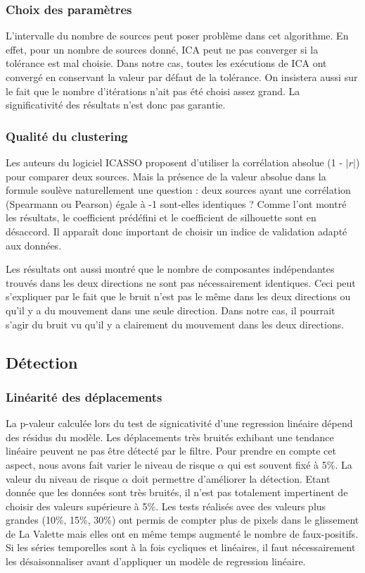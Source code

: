 \documentclass[11pt, openany]{report}
\begin{document}
\subsubsection{Choix des paramètres}
L'intervalle du nombre de sources peut poser problème dans cet algorithme. En effet, pour un nombre de sources donné, ICA peut ne pas converger si la tolérance est mal choisie. Dans notre cas, toutes les exécutions de ICA ont convergé en conservant la valeur par défaut de la tolérance. On insistera aussi sur le fait que le nombre d'itérations n'ait pas été choisi assez grand. La significativité des résultats n'est donc pas garantie.

\subsubsection{Qualité du clustering}
Les auteurs du logiciel ICASSO proposent d'utiliser la corrélation absolue (1 - $|r|$) pour comparer deux sources. Mais la présence de la valeur absolue dans la formule soulève naturellement une question : deux sources ayant une corrélation (Spearmann ou Pearson) égale à -1 sont-elles identiques ? Comme l'ont montré les résultats, le coefficient prédéfini et le coefficient de silhouette sont en désaccord. Il apparaît donc important de choisir un indice de validation adapté aux données.

Les résultats ont aussi montré que le nombre de composantes indépendantes trouvés dans les deux directions ne sont pas nécessairement identiques. Ceci peut s'expliquer par le fait que le bruit n'est pas le même dans les deux directions ou qu'il y a du mouvement dans une seule direction. Dans notre cas, il pourrait s'agir du bruit vu qu'il y a clairement du mouvement dans les deux directions.

\subsection{Détection}
\subsubsection{Linéarité des déplacements}
La p-valeur calculée lors du test de signicativité d'une regression linéaire dépend des résidus du modèle. Les déplacements très bruités exhibant une tendance linéaire peuvent ne pas être détecté par le filtre. Pour prendre en compte cet aspect, nous avons fait varier le niveau de risque $\alpha$ qui est souvent fixé à 5\%. La valeur du niveau de risque $\alpha$ doit permettre d'améliorer la détection. Etant donnée que les données sont très bruités, il n'est pas totalement impertinent de choisir des valeurs supérieure à 5\%. Les tests réalisés avec des valeurs plus grandes (10\%, 15\%, 30\%) ont permis de compter plus de pixels dans le glissement de La Valette mais elles ont en même temps  augmenté le nombre de faux-positifs. Si les séries temporelles sont à la fois cycliques et linéaires, il faut nécessairement les désaisonnaliser avant d'appliquer un modèle de regression linéaire.
\end{document}

